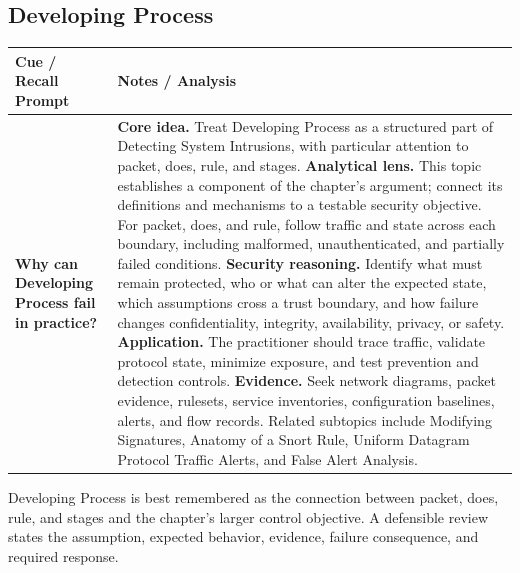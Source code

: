 \documentclass[11pt]{article}
\newcommand{\CornellHeader}{%
\rowcolor{Navy}\color{white}\bfseries Cue / Recall Prompt & \color{white}\bfseries Notes / Analysis\\\hline}
\newcommand{\CornellRow}[2]{%
\cellcolor{CueGray}\RaggedRight\textbf{#1} & \RaggedRight #2\\\hline}
\begin{document}
\subsection*{Developing Process}
\begin{longtable}{>{\RaggedRight\arraybackslash}p{}|>{\RaggedRight\arraybackslash}p{}}
\CornellHeader
\CornellRow{Why can Developing Process fail in practice?}{\textbf{Core idea.} Treat Developing Process as a structured part of Detecting System Intrusions, with particular attention to packet, does, rule, and stages. \textbf{Analytical lens.} This topic establishes a component of the chapter's argument; connect its definitions and mechanisms to a testable security objective. For packet, does, and rule, follow traffic and state across each boundary, including malformed, unauthenticated, and partially failed conditions. \textbf{Security reasoning.} Identify what must remain protected, who or what can alter the expected state, which assumptions cross a trust boundary, and how failure changes confidentiality, integrity, availability, privacy, or safety. \textbf{Application.} The practitioner should trace traffic, validate protocol state, minimize exposure, and test prevention and detection controls. \textbf{Evidence.} Seek network diagrams, packet evidence, rulesets, service inventories, configuration baselines, alerts, and flow records. Related subtopics include Modifying Signatures, Anatomy of a Snort Rule, Uniform Datagram Protocol Traffic Alerts, and False Alert Analysis.}
\end{longtable}
\begin{topicsummary}
Developing Process is best remembered as the connection between packet, does, rule, and stages and the chapter's larger control objective. A defensible review states the assumption, expected behavior, evidence, failure consequence, and required response.
\end{topicsummary}
\end{document}
